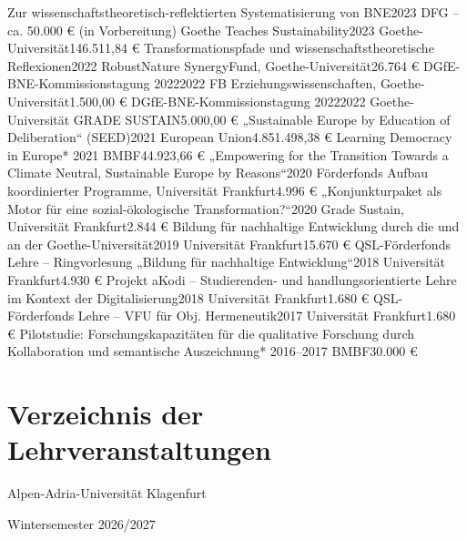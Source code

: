     \resumeSubheading
      {Zur wissenschaftstheoretisch-reflektierten Systematisierung von BNE}{2023}
      {DFG – ca. 50.000 € (in Vorbereitung)}{}
    \resumeSubheading
      {Goethe Teaches Sustainability}{2023}
      {Goethe-Universität}{146.511,84 €}
    \resumeSubheading
      {Transformationspfade und wissenschaftstheoretische Reflexionen}{2022}
      {RobustNature SynergyFund, Goethe-Universität}{26.764 €}
    \resumeSubheading
      {DGfE-BNE-Kommissionstagung 2022}{2022}
      {FB Erziehungswissenschaften, Goethe-Universität}{1.500,00 €}
    \resumeSubheading
      {DGfE-BNE-Kommissionstagung 2022}{2022}
      {Goethe-Universität GRADE SUSTAIN}{5.000,00 €}
    \resumeSubheading
      {„Sustainable Europe by Education of Deliberation“ (SEED)}{2021}
      {European Union}{4.851.498,38 €}
    \resumeSubheading
      {Learning Democracy in Europe}{* 2021}
      {BMBF}{44.923,66 €}
    \resumeSubheading
      {„Empowering for the Transition Towards a Climate Neutral, Sustainable Europe by Reasons“}{2020}
      {Förderfonds Aufbau koordinierter Programme, Universität Frankfurt}{4.996 €}
    \resumeSubheading
      {„Konjunkturpaket als Motor für eine sozial-ökologische Transformation?“}{2020}
      {Grade Sustain, Universität Frankfurt}{2.844 €}
    \resumeSubheading
      {Bildung für nachhaltige Entwicklung durch die und an der Goethe-Universität}{2019}
      {Universität Frankfurt}{15.670 €}
    \resumeSubheading
      {QSL-Förderfonds Lehre – Ringvorlesung „Bildung für nachhaltige Entwicklung“}{2018}
      {Universität Frankfurt}{4.930 €}
    \resumeSubheading
      {Projekt aKodi – Studierenden- und handlungsorientierte Lehre im Kontext der Digitalisierung}{2018}
      {Universität Frankfurt}{1.680 €}
    \resumeSubheading
      {QSL-Förderfonds Lehre – VFU für Obj. Hermeneutik}{2017}
      {Universität Frankfurt}{1.680 €}
    \resumeSubheading
      {Pilotstudie: Forschungskapazitäten für die qualitative Forschung durch Kollaboration und semantische Auszeichnung}{* 2016–2017}
      {BMBF}{30.000 €}
  \resumeSubHeadingListEnd


\section{Verzeichnis der Lehrveranstaltungen}
  \vspace{3pt}
  \resumeSubHeadingListStart
\resumeSubSubheading
      {Alpen-Adria-Universität Klagenfurt}{}

    \resumeSubSubheading
      {Wintersemester 2026/2027}{}

